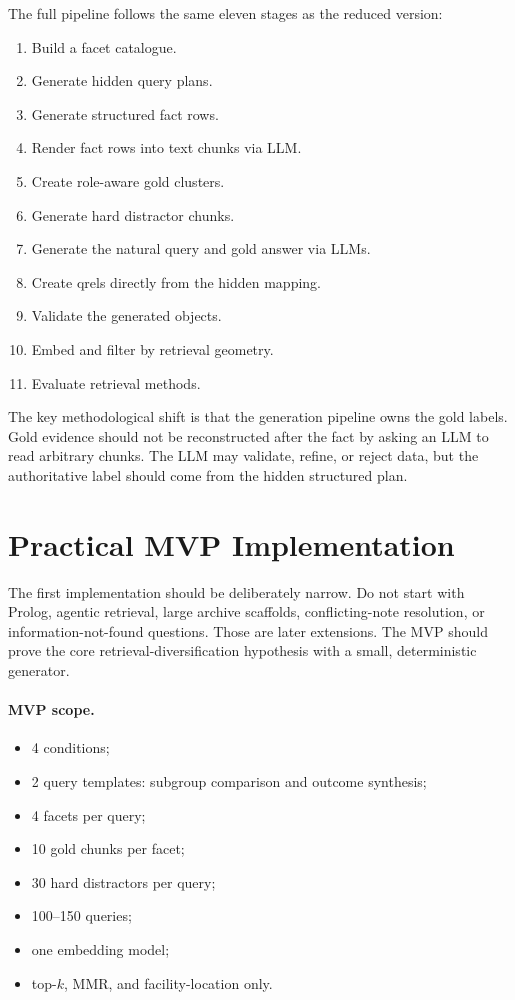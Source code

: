 \documentclass[11pt,a4paper]{article}
\begin{document}
The full pipeline follows the same eleven stages as the reduced version:

\begin{enumerate}[leftmargin=*]
	\item Build a facet catalogue.
	\item Generate hidden query plans.
	\item Generate structured fact rows.
	\item Render fact rows into text chunks via LLM.
	\item Create role-aware gold clusters.
	\item Generate hard distractor chunks.
	\item Generate the natural query and gold answer via LLMs.
	\item Create qrels directly from the hidden mapping.
	\item Validate the generated objects.
	\item Embed and filter by retrieval geometry.
	\item Evaluate retrieval methods.
\end{enumerate}

The key methodological shift is that the generation pipeline owns the gold labels. Gold evidence should not be reconstructed after the fact by asking an LLM to read arbitrary chunks. The LLM may validate, refine, or reject data, but the authoritative label should come from the hidden structured plan.

\section{Practical MVP Implementation}

The first implementation should be deliberately narrow. Do not start with Prolog, agentic retrieval, large archive scaffolds, conflicting-note resolution, or information-not-found questions. Those are later extensions. The MVP should prove the core retrieval-diversification hypothesis with a small, deterministic generator.

\paragraph{MVP scope.}

\begin{itemize}[leftmargin=*]
	\item 4 conditions;
	\item 2 query templates: subgroup comparison and outcome synthesis;
	\item 4 facets per query;
	\item 10 gold chunks per facet;
	\item 30 hard distractors per query;
	\item 100--150 queries;
	\item one embedding model;
	\item top-$k$, MMR, and facility-location only.
\end{itemize}
\end{document}
